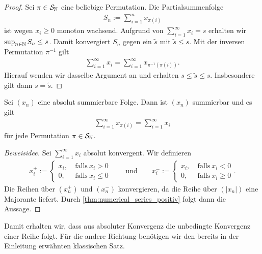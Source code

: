 \begin{proof}
	Sei $ \pi \in \mathcal{S}_{\mathbb{N}} $ eine beliebige Permutation.
	Die Partialsummenfolge
	\begin{align*}
	S_n := \sum \limits_{i=1}^n x_{\pi(i) }
	\end{align*}
	ist wegen $ x_i \geq 0 $ monoton wachsend.
	Aufgrund von $ \sum_{i=1}^\infty x_i = s $ erhalten wir $ \sup_{n \in \mathbb{N}} S_n \leq s $.
	Damit konvergiert $ S_n $ gegen ein $ \tilde{s} $ mit $ \tilde{s} \leq s $.
	Mit der inversen Permutation $ \pi^{-1}  $ gilt
	\begin{align*}
	\sum \limits_{i=1}^\infty x_{i } = \sum \limits_{i=1}^\infty x_{\pi^{-1}(\pi(i)) }.
	\end{align*}
	Hierauf wenden wir dasselbe Argument an und erhalten $ s \leq \tilde{s}\leq s $.
	Insbesondere gilt dann $ s = \tilde{s} $.
\end{proof}


\begin{sz}\label{thm:numerical_series_abs_to_conv}
	Sei  $ ( x_n )$ eine absolut summierbare Folge.
	Dann ist $ (x_n) $ summierbar und es gilt
	\begin{align*}
	\sum \limits_{i=1}^\infty x_{\pi(i) }
	=
	\sum \limits_{i=1}^\infty x_i
	\end{align*}
	für jede Permutation $ \pi \in \mathcal{S}_{\mathbb{N}} $.
\end{sz}

\begin{proof}[Beweisidee]
	Sei $ \sum_{i=1}^\infty x_i $ absolut konvergent.
	Wir definieren
	\begin{align*}
	x^+_i
	:=
	\begin{cases}
	x_i, \ &\textrm{falls} \ x_i > 0\\
	0, \ &\textrm{falls} \ x_i \leq 0
	\end{cases}
	\qquad \textrm{und} \qquad
	x^-_i
	:=
	\begin{cases}
	x_i, \ &\textrm{falls} \ x_i < 0\\
	0, \ &\textrm{falls} \ x_i \geq 0
	\end{cases}.
	\end{align*}
	Die Reihen über $ (x_n^+) $ und $ (x_n^-) $ konvergieren, da die Reihe über $ (| x_n|) $ eine Majorante liefert.
	Durch \ref{thm:numerical_series_positiv} folgt dann die Aussage. 
\end{proof}

Damit erhalten wir, dass aus absoluter Konvergenz die unbedingte Konvergenz einer Reihe folgt.
Für die andere Richtung benötigen wir den bereits in der Einleitung erwähnten klassischen Satz.

